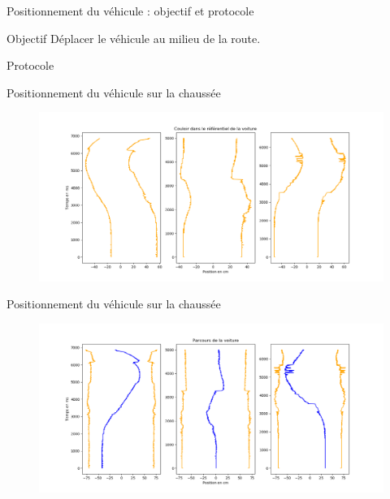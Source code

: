 \documentclass[french, handout]{beamer}
\begin{document}
        \begin{frame}{Positionnement du véhicule : objectif et protocole}
            \begin{block}{Objectif}
                Déplacer le véhicule au milieu de la route.
            \end{block}
            \begin{block}{Protocole}
            \begin{figure}
                \centering
                
            \end{figure}
            \end{block}
        \end{frame}
        
        \begin{frame}{Positionnement du véhicule sur la chaussée}
            \begin{figure}
                \centering
                \hspace*{-4.2em}
                \includegraphics[width=14cm]{couloir_voiture_temporel.png}
            \end{figure}
        \end{frame}
        
        \begin{frame}{Positionnement du véhicule sur la chaussée}
            \begin{figure}
                \centering
                \hspace*{-4.2em}
                \includegraphics[width=14cm]{parcours_voiture_temporel.png}
            \end{figure}
        \end{frame}
        
\end{document}
